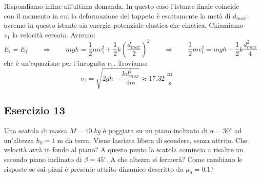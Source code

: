 \documentclass[12pt,a4paper]{book}
\begin{document}
Rispondiamo infine all'ultima domanda. In questo caso l'istante finale coincide con il momento in cui la deformazione del tappeto è esattamente la metà di $d_{max}$: avremo in questo istante sia energia potenziale elastica che cinetica. Chiamiamo $v_1$ la velocità cercata. Avremo:\\
\begin{equation*}
E_{i}=E_{f} \qquad  \Rightarrow \qquad  mgh = \frac{1}{2}m v_1^2 + \frac{1}{2}k \left(\frac{d_{max}}{2}\right)^2 \qquad  \Rightarrow \qquad  \frac{1}{2}m v_1^2 = mgh - \frac{1}{2}k\frac{d_{max}^2}{4}
\end{equation*}
che è un'equazione per l'incognita $v_1$. Troviamo:
\begin{equation*}
v_1 = \sqrt{2gh-\frac{k d^2_{max}}{4m}} \approx 17.32 \; \frac{\text{m}}{\text{s}}
\end{equation*}

\subsection*{Esercizio 13}
Una scatola di massa $M=10 \; kg$ è poggiata su un piano inclinato di $\alpha=30^{\circ}$ ad un'altezza $h_0=1\;$m da terra. Viene lasciata libera di scendere, senza attrito. Che velocità avrà in fondo al piano? A questo
punto la scatola comincia a risalire un secondo piano inclinato di $\beta=45^{\circ}$. A che altezza si fermerà? Come cambiano le risposte se sui piani è presente attrito dinamico descritto da $\mu_d = 0.1$?
\end{document}
